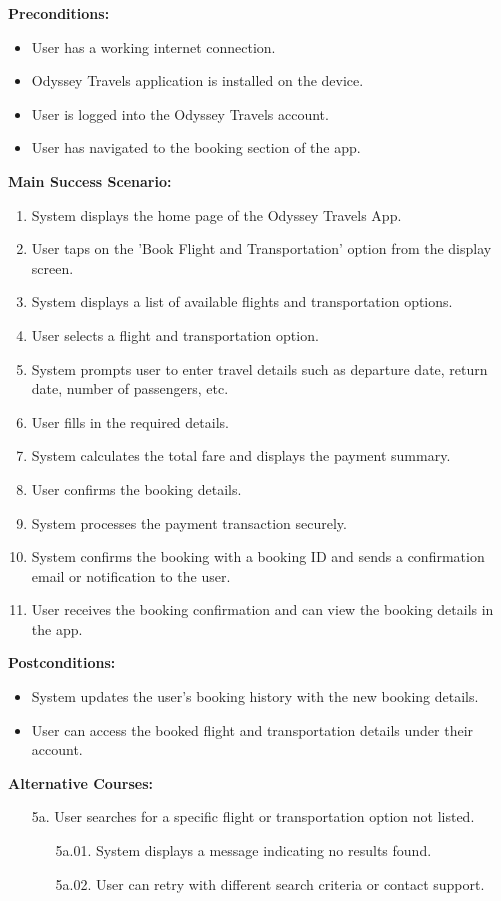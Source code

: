 \documentclass{scrreprt}
\begin{document}
\textbf{Preconditions:}
\begin{itemize}
    \item User has a working internet connection.
    \item Odyssey Travels application is installed on the device.
    \item User is logged into the Odyssey Travels account.
    \item User has navigated to the booking section of the app.
\end{itemize}

\textbf{Main Success Scenario:}
\begin{enumerate}
    \item System displays the home page of the Odyssey Travels App.
    \item User taps on the 'Book Flight and Transportation' option from the display screen.
    \item System displays a list of available flights and transportation options.
    \item User selects a flight and transportation option.
    \item System prompts user to enter travel details such as departure date, return date, number of passengers, etc.
    \item User fills in the required details.
    \item System calculates the total fare and displays the payment summary.
    \item User confirms the booking details.
    \item System processes the payment transaction securely.
    \item System confirms the booking with a booking ID and sends a confirmation email or notification to the user.
    \item User receives the booking confirmation and can view the booking details in the app.
\end{enumerate}

\textbf{Postconditions:}
\begin{itemize}
    \item System updates the user's booking history with the new booking details.
    \item User can access the booked flight and transportation details under their account.
\end{itemize}

\textbf{Alternative Courses:}
\begin{itemize}
    \item[5a.] User searches for a specific flight or transportation option not listed.
    \begin{itemize}
        \item[5a.01.] System displays a message indicating no results found.
        \item[5a.02.] User can retry with different search criteria or contact support.
    \end{itemize}
\end{itemize}
\end{document}
